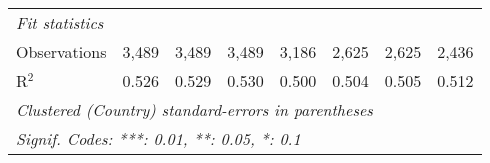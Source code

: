 \begin{tabular}{lccccccc}
   \midrule \emph{Fit statistics}\\
   Observations                                                       & 3,489          & 3,489         & 3,489          & 3,186         & 2,625         & 2,625         & 2,436\\  
   R$^2$                                                              & 0.526          & 0.529         & 0.530          & 0.500         & 0.504         & 0.505         & 0.512\\  
   \midrule
   \multicolumn{8}{l}{\emph{Clustered (Country) standard-errors in parentheses}}\\
   \multicolumn{8}{l}{\emph{Signif. Codes: ***: 0.01, **: 0.05, *: 0.1}}\\
\end{tabular}
\par\endgroup


